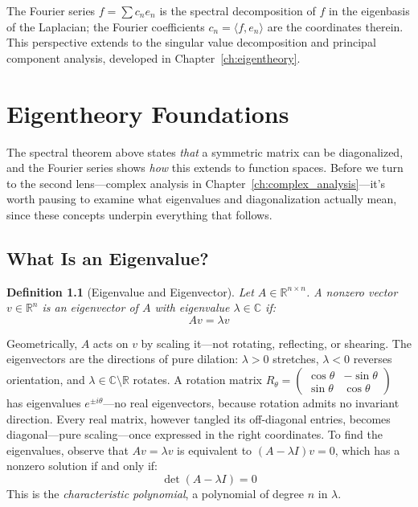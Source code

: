\documentclass[12pt,a4paper]{report}
\theoremstyle{thms}
\theoremstyle{defns}
\newtheorem{definition}{Definition}[section]
\begin{document}
The Fourier series $f = \sum c_n e_n$ is the spectral decomposition of $f$ in the eigenbasis of the Laplacian; the Fourier coefficients $c_n = \langle f, e_n \rangle$ are the coordinates therein. This perspective extends to the singular value decomposition and principal component analysis, developed in Chapter~\ref{ch:eigentheory}.

\chapter{Eigentheory Foundations}
\label{ch:eigentheory_foundations}

The spectral theorem above states \textit{that} a symmetric matrix can be diagonalized, and the Fourier series shows \textit{how} this extends to function spaces. Before we turn to the second lens—complex analysis in Chapter~\ref{ch:complex_analysis}—it's worth pausing to examine what eigenvalues and diagonalization actually mean, since these concepts underpin everything that follows.

\section{What Is an Eigenvalue?}
\label{sec:what_is_eigenvalue}

\begin{definition}[Eigenvalue and Eigenvector]
    Let $A \in \mathbb{R}^{n \times n}$. A nonzero vector $v \in \mathbb{R}^n$ is an \textit{eigenvector} of $A$ with \textit{eigenvalue} $\lambda \in \mathbb{C}$ if:
    \begin{equation}
        Av = \lambda v
    \end{equation}
\end{definition}

Geometrically, $A$ acts on $v$ by scaling it—not rotating, reflecting, or shearing. The eigenvectors are the directions of pure dilation: $\lambda > 0$ stretches, $\lambda < 0$ reverses orientation, and $\lambda \in \mathbb{C} \setminus \mathbb{R}$ rotates. A rotation matrix $R_\theta = \begin{pmatrix} \cos\theta & -\sin\theta \\ \sin\theta & \cos\theta \end{pmatrix}$ has eigenvalues $e^{\pm i\theta}$—no real eigenvectors, because rotation admits no invariant direction. Every real matrix, however tangled its off-diagonal entries, becomes diagonal—pure scaling—once expressed in the right coordinates. To find the eigenvalues, observe that $Av = \lambda v$ is equivalent to $(A - \lambda I)v = 0$, which has a nonzero solution if and only if:
\begin{equation}
    \det(A - \lambda I) = 0
    \label{eq:char_poly}
\end{equation}
This is the \textit{characteristic polynomial}, a polynomial of degree $n$ in $\lambda$.
\end{document}
